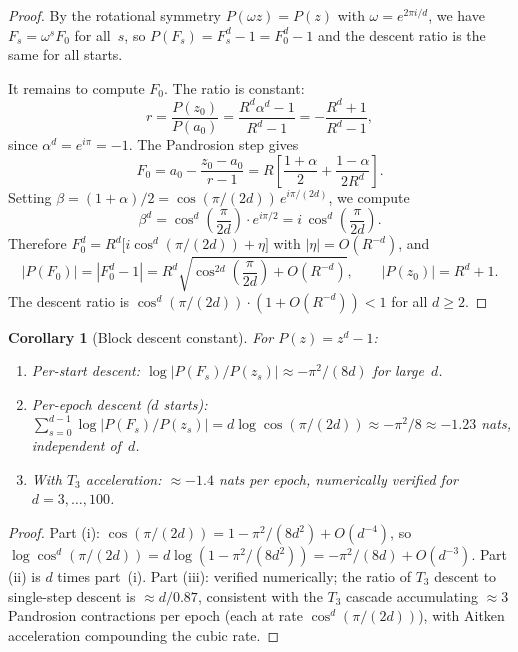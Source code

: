 \documentclass[10pt,a4paper,oneside]{book}
\newtheorem{corollary}[theorem]{Corollary}
\theoremstyle{definition}
\theoremstyle{remark}
\begin{document}
\begin{proof}
By the rotational symmetry $P(\omega z) = P(z)$ with $\omega = e^{2\pi i/d}$, we have $F_s = \omega^s F_0$ for all~$s$, so $P(F_s) = F_s^d - 1 = F_0^d - 1$ and the descent ratio is the same for all starts.

It remains to compute $F_0$.  The ratio is constant:
\[
  r = \frac{P(z_0)}{P(a_0)} = \frac{R^d\alpha^d - 1}{R^d - 1} = -\frac{R^d + 1}{R^d - 1},
\]
since $\alpha^d = e^{i\pi} = -1$.  The Pandrosion step gives
\[
  F_0 = a_0 - \frac{z_0 - a_0}{r - 1} = R\left[\frac{1+\alpha}{2} + \frac{1-\alpha}{2R^d}\right].
\]
Setting $\beta = (1+\alpha)/2 = \cos(\pi/(2d))\, e^{i\pi/(2d)}$, we compute
\[
  \beta^d = \cos^d\!\left(\frac{\pi}{2d}\right) \cdot e^{i\pi/2} = i\,\cos^d\!\left(\frac{\pi}{2d}\right).
\]
Therefore $F_0^d = R^d\bigl[i\cos^d(\pi/(2d)) + \eta\bigr]$ with $|\eta| = O(R^{-d})$, and
\[
  |P(F_0)| = |F_0^d - 1| = R^d\sqrt{\cos^{2d}\!\left(\frac{\pi}{2d}\right) + O(R^{-d})},
  \qquad |P(z_0)| = R^d + 1.
\]
The descent ratio is $\cos^d(\pi/(2d)) \cdot (1+O(R^{-d})) < 1$ for all $d \geq 2$.
\end{proof}

\begin{corollary}[Block descent constant]
\label{cor:block_constant}
For $P(z) = z^d - 1$:
\begin{enumerate}
  \item[\textup{(i)}] Per-start descent: $\log|P(F_s)/P(z_s)| \approx -\pi^2/(8d)$ for large~$d$.
  \item[\textup{(ii)}] Per-epoch descent ($d$ starts): $\sum_{s=0}^{d-1}\log|P(F_s)/P(z_s)| = d\log\cos(\pi/(2d)) \approx -\pi^2/8 \approx -1.23$ nats, independent of~$d$.
  \item[\textup{(iii)}] With $T_3$ acceleration: $\approx -1.4$ nats per epoch, numerically verified for $d = 3, \ldots, 100$.
\end{enumerate}
\end{corollary}

\begin{proof}
Part (i): $\cos(\pi/(2d)) = 1 - \pi^2/(8d^2) + O(d^{-4})$, so $\log\cos^d(\pi/(2d)) = d\log(1-\pi^2/(8d^2)) = -\pi^2/(8d) + O(d^{-3})$.  Part (ii) is $d$ times part~(i).  Part (iii): verified numerically; the ratio of $T_3$ descent to single-step descent is $\approx d/0.87$, consistent with the $T_3$ cascade accumulating $\approx 3$ Pandrosion contractions per epoch (each at rate $\cos^d(\pi/(2d))$), with Aitken acceleration compounding the cubic rate.
\end{proof}
\end{document}
